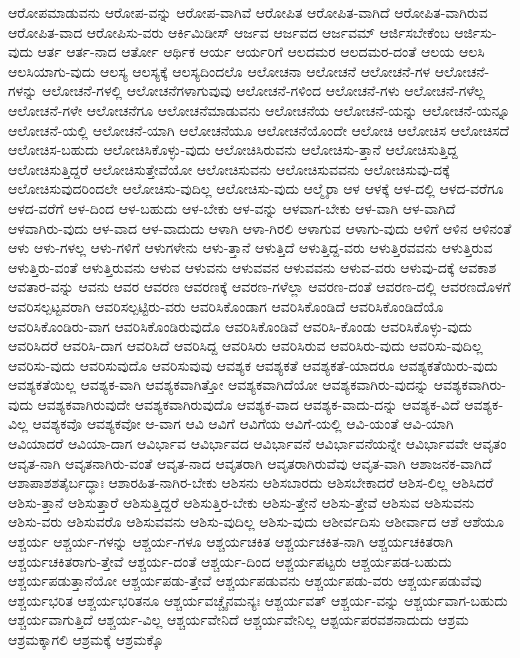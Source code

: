 {ಆರೋಪಮಾಡುವನು
ಆರೋಪ-ವನ್ನು
ಆರೋಪ-ವಾಗಿವೆ
ಆರೋಪಿತ
ಆರೋಪಿತ-ವಾಗಿದೆ
ಆರೋಪಿತ-ವಾಗಿರುವ
ಆರೋಪಿತ-ವಾದ
ಆರೋಪಿಸು-ವರು
ಆರ್ಕಿಮಿಡೀಸ್
ಆರ್ಜವ
ಆರ್ಜವದ
ಆರ್ಜವಮ್
ಆರ್ಜಿಸಬೇಕೆಂಬ
ಆರ್ಜಿಸು-ವುದು
ಆರ್ತ
ಆರ್ತ-ನಾದ
ಆರ್ತೋ
ಆರ್ಥಿಕ
ಆರ್ಯ
ಆರ್ಯರಿಗೆ
ಆಲದಮರ
ಆಲದಮರ-ದಂತೆ
ಆಲಯ
ಆಲಸಿ
ಆಲಸಿಯಾಗು-ವುದು
ಆಲಸ್ಯ
ಆಲಸ್ಯಕ್ಕೆ
ಆಲಸ್ಯದಿಂದಲೊ
ಆಲೋಚನಾ
ಆಲೋಚನೆ
ಆಲೋಚನೆ-ಗಳ
ಆಲೋಚನೆ-ಗಳನ್ನು
ಆಲೋಚನೆ-ಗಳಲ್ಲಿ
ಆಲೋಚನೆಗಳಾಗುವುವು
ಆಲೋಚನೆ-ಗಳಿಂದ
ಆಲೋಚನೆ-ಗಳು
ಆಲೋಚನೆ-ಗಳೆಲ್ಲ
ಆಲೋಚನೆ-ಗಳೇ
ಆಲೋಚನೆಗೂ
ಆಲೋಚನೆಮಾಡುವನು
ಆಲೋಚನೆಯ
ಆಲೋಚನೆ-ಯನ್ನು
ಆಲೋಚನೆ-ಯನ್ನೂ
ಆಲೋಚನೆ-ಯಲ್ಲಿ
ಆಲೋಚನೆ-ಯಾಗಿ
ಆಲೋಚನೆಯೂ
ಆಲೋಚನೆಯೊಂದೇ
ಆಲೋಚಿ
ಆಲೋಚಿಸ
ಆಲೋಚಿಸದೆ
ಆಲೋಚಿಸ-ಬಹುದು
ಆಲೋಚಿಸಿಕೊಳ್ಳು-ವುದು
ಆಲೋಚಿಸಿರುವನು
ಆಲೋಚಿಸು-ತ್ತಾನೆ
ಆಲೋಚಿಸುತ್ತಿದ್ದ
ಆಲೋಚಿಸುತ್ತಿದ್ದರೆ
ಆಲೋಚಿಸುತ್ತೇವೆಯೋ
ಆಲೋಚಿಸುವನು
ಆಲೋಚಿಸುವವನು
ಆಲೋಚಿಸುವು-ದಕ್ಕೆ
ಆಲೋಚಿಸುವುದರಿಂದಲೇ
ಆಲೋಚಿಸು-ವುದಿಲ್ಲ
ಆಲೋಚಿಸು-ವುದು
ಆಲ್ಮೈರಾ
ಆಳ
ಆಳಕ್ಕೆ
ಆಳ-ದಲ್ಲಿ
ಆಳದ-ವರೆಗೂ
ಆಳದ-ವರೆಗೆ
ಆಳ-ದಿಂದ
ಆಳ-ಬಹುದು
ಆಳ-ಬೇಕು
ಆಳ-ವನ್ನು
ಆಳವಾಗ-ಬೇಕು
ಆಳ-ವಾಗಿ
ಆಳ-ವಾಗಿದೆ
ಆಳವಾಗಿರು-ವುದು
ಆಳ-ವಾದ
ಆಳ-ವಾದುದು
ಆಳಾಗಿ
ಆಳಾ-ಗಿರಲಿ
ಆಳಾಗುವ
ಆಳಾಗು-ವುದು
ಆಳಿಗೆ
ಆಳಿನ
ಆಳಿನಂತೆ
ಆಳು
ಆಳು-ಗಳಲ್ಲ
ಆಳು-ಗಳಿಗೆ
ಆಳುಗಳೇನು
ಆಳು-ತ್ತಾನೆ
ಆಳುತ್ತಿದೆ
ಆಳುತ್ತಿದ್ದ-ವರು
ಆಳುತ್ತಿರವವನು
ಆಳುತ್ತಿರುವ
ಆಳುತ್ತಿರು-ವಂತೆ
ಆಳುತ್ತಿರುವನು
ಆಳುವ
ಆಳುವನು
ಆಳುವವನ
ಆಳುವವನು
ಆಳುವ-ವರು
ಆಳುವು-ದಕ್ಕೆ
ಆವಕಾಶ
ಆವತಾರ-ವನ್ನು
ಆವನು
ಆವರ
ಆವರಣ
ಆವರಣಕ್ಕೆ
ಆವರಣ-ಗಳೆಲ್ಲಾ
ಆವರಣ-ದಂತೆ
ಆವರಣ-ದಲ್ಲಿ
ಆವರಣದೊಳಗೆ
ಆವರಿಸಲ್ಪಟ್ಟವರಾಗಿ
ಆವರಿಸಲ್ಪಟ್ಟಿರು-ವರು
ಆವರಿಸಿಕೊಂಡಾಗ
ಆವರಿಸಿಕೊಂಡಿದೆ
ಆವರಿಸಿಕೊಂಡಿದೆಯೊ
ಆವರಿಸಿಕೊಂಡಿರು-ವಾಗ
ಆವರಿಸಿಕೊಂಡಿರುವುದೊ
ಆವರಿಸಿಕೊಂಡಿವೆ
ಆವರಿಸಿ-ಕೊಂಡು
ಆವರಿಸಿಕೊಳ್ಳು-ವುದು
ಆವರಿಸಿದರೆ
ಆವರಿಸಿ-ದಾಗ
ಆವರಿಸಿದೆ
ಆವರಿಸಿದ್ದ
ಆವರಿಸಿರು
ಆವರಿಸಿರುವ
ಆವರಿಸಿರು-ವುದು
ಆವರಿಸು-ವುದಿಲ್ಲ
ಆವರಿಸು-ವುದು
ಆವರಿಸುವುದೊ
ಆವರಿಸುವುವು
ಆವಶ್ಯಕ
ಆವಶ್ಯಕತೆ
ಆವಶ್ಯಕತೆ-ಯಾದರೂ
ಆವಶ್ಯಕತೆಯಿರು-ವುದು
ಆವಶ್ಯಕತೆಯಿಲ್ಲ
ಆವಶ್ಯಕ-ವಾಗಿ
ಆವಶ್ಯಕವಾಗಿತ್ತೋ
ಆವಶ್ಯಕವಾಗಿದೆಯೋ
ಆವಶ್ಯಕವಾಗಿರು-ವುದನ್ನು
ಆವಶ್ಯಕವಾಗಿರು-ವುದು
ಆವಶ್ಯಕವಾಗಿರುವುದೇ
ಆವಶ್ಯಕವಾಗಿರುವುದೊ
ಆವಶ್ಯಕ-ವಾದ
ಆವಶ್ಯಕ-ವಾದು-ದನ್ನು
ಆವಶ್ಯಕ-ವಿದೆ
ಆವಶ್ಯಕ-ವಿಲ್ಲ
ಆವಶ್ಯಕವೊ
ಆವಶ್ಯಕವೋ
ಆ-ವಾಗ
ಆವಿ
ಆವಿಗೆ
ಆವಿಗೆಯ
ಆವಿಗೆ-ಯಲ್ಲಿ
ಆವಿ-ಯಂತೆ
ಆವಿ-ಯಾಗಿ
ಆವಿಯಾದರೆ
ಆವಿಯಾ-ದಾಗ
ಆವಿರ್ಭಾವ
ಆವಿರ್ಭಾವದ
ಆವಿರ್ಭಾವನೆ
ಆವಿರ್ಭಾವನೆಯನ್ನೇ
ಆವಿರ್ಭಾವವೇ
ಆವೃತಂ
ಆವೃತ-ನಾಗಿ
ಆವೃತನಾಗಿರು-ವಂತೆ
ಆವೃತ-ನಾದ
ಆವೃತರಾಗಿ
ಆವೃತರಾಗಿರುವೆವು
ಆವೃತ-ವಾಗಿ
ಆಶಾಜನಕ-ವಾಗಿದೆ
ಆಶಾಪಾಶಶತೈರ್ಬದ್ಧಾಃ
ಆಶಾರಹಿತ-ನಾಗಿರ-ಬೇಕು
ಆಶಿಸನು
ಆಶಿಸಬಾರದು
ಆಶಿಸಬೇಕಾದರೆ
ಆಶಿಸ-ಲಿಲ್ಲ
ಆಶಿಸಿದರೆ
ಆಶಿಸು-ತ್ತಾನೆ
ಆಶಿಸುತ್ತಾರೆ
ಆಶಿಸುತ್ತಿದ್ದರೆ
ಆಶಿಸುತ್ತಿರ-ಬೇಕು
ಆಶಿಸು-ತ್ತೇನೆ
ಆಶಿಸು-ತ್ತೇವೆ
ಆಶಿಸುವ
ಆಶಿಸುವನು
ಆಶಿಸು-ವರು
ಆಶಿಸುವರೊ
ಆಶಿಸುವವನು
ಆಶಿಸು-ವುದಿಲ್ಲ
ಆಶಿಸು-ವುದು
ಆಶೀರ್ವದಿಸು
ಆಶೀರ್ವಾದ
ಆಶೆ
ಆಶೆಯೂ
ಆಶ್ಚರ್ಯ
ಆಶ್ಚರ್ಯ-ಗಳನ್ನು
ಆಶ್ಚರ್ಯ-ಗಳೂ
ಆಶ್ಚರ್ಯಚಕಿತ
ಆಶ್ಚರ್ಯಚಕಿತ-ನಾಗಿ
ಆಶ್ಚರ್ಯಚಕಿತರಾಗಿ
ಆಶ್ಚರ್ಯಚಕಿತರಾಗು-ತ್ತೇವೆ
ಆಶ್ಚರ್ಯ-ದಂತೆ
ಆಶ್ಚರ್ಯ-ದಿಂದ
ಆಶ್ಚರ್ಯಪಟ್ಟರು
ಆಶ್ಚರ್ಯಪಡ-ಬಹುದು
ಆಶ್ಚರ್ಯಪಡುತ್ತಾನೆಯೋ
ಆಶ್ಚರ್ಯಪಡು-ತ್ತೇವೆ
ಆಶ್ಚರ್ಯಪಡುವನು
ಆಶ್ಚರ್ಯಪಡು-ವರು
ಆಶ್ಚರ್ಯಪಡುವೆವು
ಆಶ್ಚರ್ಯಭರಿತ
ಆಶ್ಚರ್ಯಭರಿತನೂ
ಆಶ್ಚರ್ಯವಚ್ಚೈನಮನ್ಯಃ
ಆಶ್ಚರ್ಯವತ್
ಆಶ್ಚರ್ಯ-ವನ್ನು
ಆಶ್ಚರ್ಯವಾಗ-ಬಹುದು
ಆಶ್ಚರ್ಯವಾಗುತ್ತಿದೆ
ಆಶ್ಚರ್ಯ-ವಿಲ್ಲ
ಆಶ್ಚರ್ಯವೇನಿದೆ
ಆಶ್ಚರ್ಯವೇನಿಲ್ಲ
ಆಶ್ಟರ್ಯಪರವಶನಾದುದು
ಆಶ್ರಮ
ಆಶ್ರಮಕ್ಕಾಗಲಿ
ಆಶ್ರಮಕ್ಕೆ
ಆಶ್ರಮಕ್ಕೊ
}
